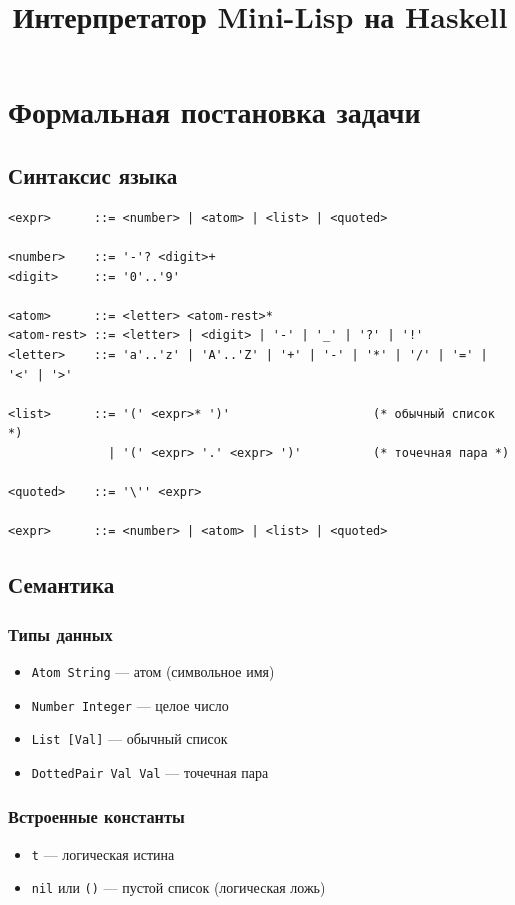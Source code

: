 \documentclass[a4paper,12pt]{article}
\title{Интерпретатор Mini-Lisp на Haskell \\[0.3cm]
\large }
\author{}
\date{}
\begin{document}
\maketitle

\section{Формальная постановка задачи}

\subsection{Синтаксис языка}

\begin{verbatim}
<expr>      ::= <number> | <atom> | <list> | <quoted>

<number>    ::= '-'? <digit>+
<digit>     ::= '0'..'9'

<atom>      ::= <letter> <atom-rest>*
<atom-rest> ::= <letter> | <digit> | '-' | '_' | '?' | '!'
<letter>    ::= 'a'..'z' | 'A'..'Z' | '+' | '-' | '*' | '/' | '=' | '<' | '>'

<list>      ::= '(' <expr>* ')'                    (* обычный список *)
              | '(' <expr> '.' <expr> ')'          (* точечная пара *)

<quoted>    ::= '\'' <expr>

<expr>      ::= <number> | <atom> | <list> | <quoted>
\end{verbatim}

\subsection{Семантика}

\subsubsection{Типы данных}
\begin{itemize}
    \item \texttt{Atom String} — атом (символьное имя)
    \item \texttt{Number Integer} — целое число
    \item \texttt{List [Val]} — обычный список
    \item \texttt{DottedPair Val Val} — точечная пара
\end{itemize}

\subsubsection{Встроенные константы}
\begin{itemize}
    \item \texttt{t} — логическая истина
    \item \texttt{nil} или \texttt{()} — пустой список (логическая ложь)
\end{itemize}
\end{document}
